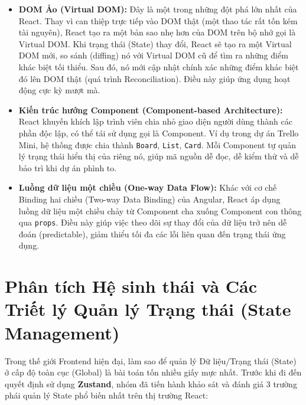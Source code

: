 \begin{itemize}
    \item \textbf{DOM Ảo (Virtual DOM):} Đây là một trong những đột phá lớn nhất của React. Thay vì can thiệp trực tiếp vào DOM thật (một thao tác rất tốn kém tài nguyên), React tạo ra một bản sao nhẹ hơn của DOM trên bộ nhớ gọi là Virtual DOM. Khi trạng thái (State) thay đổi, React sẽ tạo ra một Virtual DOM mới, so sánh (diffing) nó với Virtual DOM cũ để tìm ra những điểm khác biệt tối thiểu. Sau đó, nó mới cập nhật chính xác những điểm khác biệt đó lên DOM thật (quá trình Reconciliation). Điều này giúp ứng dụng hoạt động cực kỳ mượt mà.

    \item \textbf{Kiến trúc hướng Component (Component-based Architecture):} React khuyến khích lập trình viên chia nhỏ giao diện người dùng thành các phần độc lập, có thể tái sử dụng gọi là Component. Ví dụ trong dự án Trello Mini, hệ thống được chia thành \texttt{Board}, \texttt{List}, \texttt{Card}. Mỗi Component tự quản lý trạng thái hiển thị của riêng nó, giúp mã nguồn dễ đọc, dễ kiểm thử và dễ bảo trì khi dự án phình to.

    \item \textbf{Luồng dữ liệu một chiều (One-way Data Flow):} Khác với cơ chế Binding hai chiều (Two-way Data Binding) của Angular, React áp dụng luồng dữ liệu một chiều chảy từ Component cha xuống Component con thông qua \texttt{props}. Điều này giúp việc theo dõi sự thay đổi của dữ liệu trở nên dễ đoán (predictable), giảm thiểu tối đa các lỗi liên quan đến trạng thái ứng dụng.
\end{itemize}

\section{Phân tích Hệ sinh thái và Các Triết lý Quản lý Trạng thái (State Management)}
Trong thế giới Frontend hiện đại, làm sao để quản lý Dữ liệu/Trạng thái (State) ở cấp độ toàn cục (Global) là bài toán tốn nhiều giấy mực nhất. Trước khi đi đến quyết định sử dụng \textbf{Zustand}, nhóm đã tiến hành khảo sát và đánh giá 3 trường phái quản lý State phổ biến nhất trên thị trường React:

